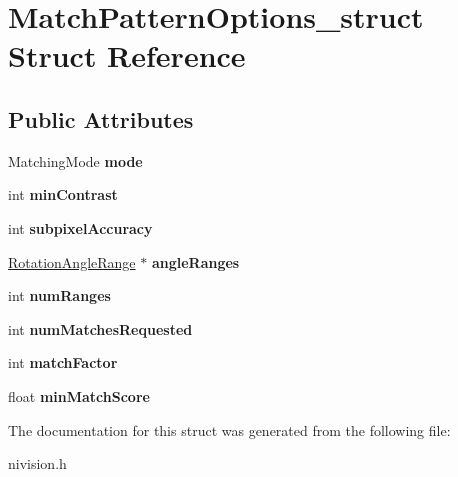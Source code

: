 \hypertarget{structMatchPatternOptions__struct}{
\section{MatchPatternOptions\_\-struct Struct Reference}
\label{structMatchPatternOptions__struct}
}
\subsection*{Public Attributes}
\begin{DoxyCompactItemize}
\item 
\hypertarget{structMatchPatternOptions__struct_ab1e170717034764e8ad65570dca7506f}{
MatchingMode {\bfseries mode}}
\label{structMatchPatternOptions__struct_ab1e170717034764e8ad65570dca7506f}

\item 
\hypertarget{structMatchPatternOptions__struct_a6db2d921ce9f44f1f412c43f5180f2f0}{
int {\bfseries minContrast}}
\label{structMatchPatternOptions__struct_a6db2d921ce9f44f1f412c43f5180f2f0}

\item 
\hypertarget{structMatchPatternOptions__struct_a705ce296b6255718b1ceee611d9f5899}{
int {\bfseries subpixelAccuracy}}
\label{structMatchPatternOptions__struct_a705ce296b6255718b1ceee611d9f5899}

\item 
\hypertarget{structMatchPatternOptions__struct_a02aa56767f9e33b832e77458eb1e8992}{
\hyperlink{structRotationAngleRange__struct}{RotationAngleRange} $\ast$ {\bfseries angleRanges}}
\label{structMatchPatternOptions__struct_a02aa56767f9e33b832e77458eb1e8992}

\item 
\hypertarget{structMatchPatternOptions__struct_af1663ff7555712167283b72200a1b160}{
int {\bfseries numRanges}}
\label{structMatchPatternOptions__struct_af1663ff7555712167283b72200a1b160}

\item 
\hypertarget{structMatchPatternOptions__struct_a10fefb2ee3eaf6721f0851240708b944}{
int {\bfseries numMatchesRequested}}
\label{structMatchPatternOptions__struct_a10fefb2ee3eaf6721f0851240708b944}

\item 
\hypertarget{structMatchPatternOptions__struct_aec4093a0d57c047149def8dba39ee25b}{
int {\bfseries matchFactor}}
\label{structMatchPatternOptions__struct_aec4093a0d57c047149def8dba39ee25b}

\item 
\hypertarget{structMatchPatternOptions__struct_a19d4732abdf05e0bcf0a8ee5330067e3}{
float {\bfseries minMatchScore}}
\label{structMatchPatternOptions__struct_a19d4732abdf05e0bcf0a8ee5330067e3}

\end{DoxyCompactItemize}


The documentation for this struct was generated from the following file:\begin{DoxyCompactItemize}
\item 
nivision.h\end{DoxyCompactItemize}
